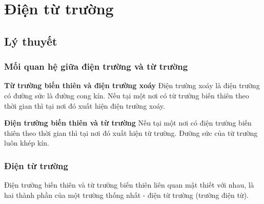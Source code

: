
\chapter[Điện từ trường]{Điện từ trường}
\section{Lý thuyết}
\subsection{Mối quan hệ giữa điện trường và từ trường}
\textbf{Từ trường biến thiên và điện trường xoáy}
Điện trường xoáy là điện trường có đường sức là đường cong kín.
Nếu tại một nơi có từ trường biến thiên theo thời gian thì tại nơi đó xuất hiện điện trường xoáy.

\textbf{Điện trường biến thiên và từ trường}
Nếu tại một nơi có điện trường biến thiên theo thời gian thì tại nơi đó xuất hiện từ trường.
Đường sức của từ trường luôn khép kín.
\subsection {Điện từ trường }
Điện trường biến thiên và từ trường biến thiên liên quan mật thiết với nhau, là hai thành phần của một trường thống nhất - điện từ trường (trường điện từ).
